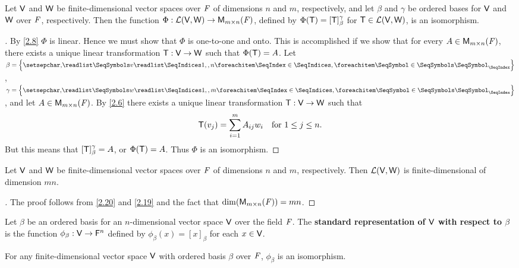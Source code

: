 \begin{thm}\label{2.20}
	Let \(\mathsf{V}\) and \(\mathsf{W}\) be finite-dimensional vector spaces over \(\mathit{F}\) of dimensions \(n\) and \(m\), respectively, and let \(\beta\) and \(\gamma\) be ordered bases for \(\mathsf{V}\) and \(\mathsf{W}\) over \(\mathit{F}\), respectively.
	Then the function \(\Phi : \ls(\V, \W) \to \MS\), defined by \(\Phi(\mathsf{T}) = [\mathsf{T}]_{\beta}^{\gamma}\) for \(\mathsf{T} \in \mathcal{L}(\mathsf{V}, \mathsf{W})\), is an isomorphism.
\end{thm}

\begin{proof}[]
	By \cref{2.8} \(\Phi\) is linear.
	Hence we must show that \(\Phi\) is one-to-one and onto.
	This is accomplished if we show that for every \(A \in \MS\), there exists a unique linear transformation \(\mathsf{T} : \mathsf{V} \to \mathsf{W}\) such that \(\Phi(\mathsf{T}) = A\).
	Let \(\beta = \set{\seq{v}{1,,n}}\), \(\gamma = \set{\seq{w}{1,,m}}\), and let \(A \in \MS\).
	By \cref{2.6} there exists a unique linear transformation \(\mathsf{T} : \mathsf{V} \to \mathsf{W}\) such that
	\[
		\mathsf{T}(v_j) = \sum_{i = 1}^m A_{i j} w_i \quad \text{for } 1 \leq j \leq n.
	\]
	But this means that \([\mathsf{T}]_{\beta}^{\gamma} = A\), or \(\Phi(\mathsf{T}) = A\).
	Thus \(\Phi\) is an isomorphism.
\end{proof}

\begin{cor}\label{2.4.10}
	Let \(\mathsf{V}\) and \(\mathsf{W}\) be finite-dimensional vector spaces over \(\mathit{F}\) of dimensions \(n\) and \(m\), respectively.
	Then \(\mathcal{L}(\mathsf{V}, \mathsf{W})\) is finite-dimensional of dimension \(mn\).
\end{cor}

\begin{proof}[]
	The proof follows from \cref{2.20} and \cref{2.19} and the fact that \(\dim(\MS) = mn\).
\end{proof}

\begin{defn}\label{2.4.11}
	Let \(\beta\) be an ordered basis for an \(n\)-dimensional vector space \(\mathsf{V}\) over the field \(\mathit{F}\).
	The \textbf{standard representation of \(\mathsf{V}\) with respect to \(\beta\)} is the function \(\phi_{\beta} : \mathsf{V} \to \mathsf{F}^n\) defined by \(\phi_{\beta}(x) = [x]_{\beta}\) for each \(x \in \mathsf{V}\).
\end{defn}

\begin{thm}\label{2.21}
	For any finite-dimensional vector space \(\mathsf{V}\) with ordered basis \(\beta\) over \(\mathit{F}\), \(\phi_{\beta}\) is an isomorphism.
\end{thm}

